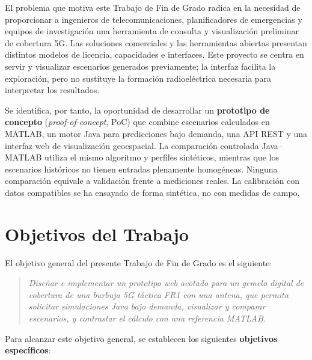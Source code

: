 El problema que motiva este Trabajo de Fin de Grado radica en la necesidad de proporcionar a ingenieros de telecomunicaciones, planificadores de emergencias y equipos de investigación una herramienta de consulta y visualización preliminar de cobertura 5G. Las soluciones comerciales y las herramientas abiertas presentan distintos modelos de licencia, capacidades e interfaces. Este proyecto se centra en servir y visualizar escenarios generados previamente; la interfaz facilita la exploración, pero no sustituye la formación radioeléctrica necesaria para interpretar los resultados.

Se identifica, por tanto, la oportunidad de desarrollar un \textbf{prototipo de concepto} (\textit{proof-of-concept}, PoC) que combine escenarios calculados en MATLAB, un motor Java para predicciones bajo demanda, una API REST y una interfaz web de visualización geoespacial. La comparación controlada Java--MATLAB utiliza el mismo algoritmo y perfiles sintéticos, mientras que los escenarios históricos no tienen entradas plenamente homogéneas. Ninguna comparación equivale a validación frente a mediciones reales. La calibración con datos compatibles se ha ensayado de forma sintética, no con medidas de campo.

\section{Objetivos del Trabajo}
\label{sec:objetivos}

El objetivo general del presente Trabajo de Fin de Grado es el siguiente:

\begin{quote}
\textit{Diseñar e implementar un prototipo web acotado para un gemelo digital de cobertura de una burbuja 5G táctica FR1 con una antena, que permita solicitar simulaciones Java bajo demanda, visualizar y comparar escenarios, y contrastar el cálculo con una referencia MATLAB.}
\end{quote}

Para alcanzar este objetivo general, se establecen los siguientes \textbf{objetivos específicos}:

